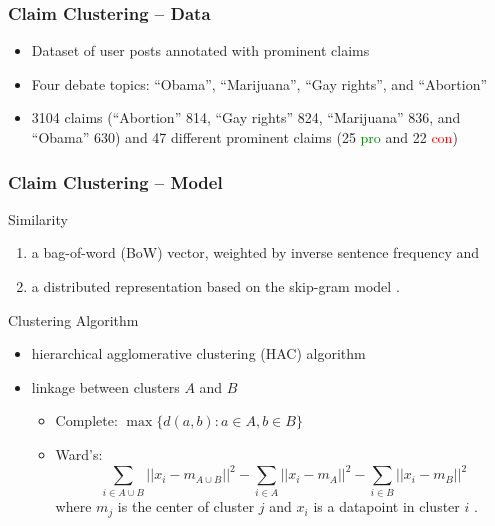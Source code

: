 \documentclass{beamer}
\begin{document}

\begin{frame}
	\frametitle{Claim Clustering -- Data}
	\begin{itemize}
		\item Dataset of user posts annotated with prominent claims \cite{hasan2014you}
		\item Four debate topics: 
		``Obama'', ``Marijuana'', ``Gay rights'', and ``Abortion'' 
	\item 3104 claims (``Abortion'' 814, ``Gay rights'' 824, ``Marijuana'' 836, and ``Obama'' 630) and 
		47 different prominent claims (25 \textcolor{green}{pro} and 22 \textcolor{red}{con})
	\end{itemize}
\end{frame}


\begin{frame}
	\frametitle{Claim Clustering -- Model}
	Similarity
\begin{enumerate} 
\item a bag-of-word (BoW) vector, weighted
by inverse sentence frequency \cite{ramage2009random} and 
\item a distributed representation based on the skip-gram model
	\cite{mikolov2013distributed}. 
\end{enumerate}
\vfill
Clustering Algorithm
\begin{itemize}
	\item hierarchical agglomerative clustering (HAC) algorithm \cite{szekely2005hierarchical}
	\item linkage between clusters $A$ and $B$
		\begin{itemize}
			\item Complete: $\max \{d(a, b): a \in A, b \in B\}$
			\item Ward's:
		$$
		\sum_{i \in A \cup B} ||x_i - m_{A \cup B}||^2 - \sum_{i \in A}||x_i - m_A||^2 
		- \sum_{i \in B} ||x_i - m_B||^2
		$$ 
		where $m_j$ is the center of cluster $j$  and $x_i$ is a datapoint
		in cluster $i$ \cite{ward1963hierarchical}.
		\end{itemize}
\end{itemize}
\end{frame}
\end{document}
